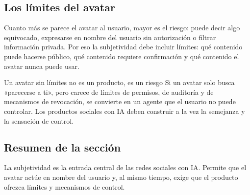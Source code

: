 \subsection{Los límites del avatar}

Cuanto más se parece el avatar al usuario, mayor es el riesgo: puede decir algo equivocado, expresarse en nombre del usuario sin autorización o filtrar información privada. Por eso la subjetividad debe incluir límites: qué contenido puede hacerse público, qué contenido requiere confirmación y qué contenido el avatar nunca puede usar.

\begin{warningbox}{Un avatar sin límites no es un producto, es un riesgo}
Si un avatar solo busca «parecerse a ti», pero carece de límites de permisos, de auditoría y de mecanismos de revocación, se convierte en un agente que el usuario no puede controlar. Los productos sociales con IA deben construir a la vez la semejanza y la sensación de control.
\end{warningbox}

\subsection{Resumen de la sección}

La subjetividad es la entrada central de las redes sociales con IA. Permite que el avatar actúe en nombre del usuario y, al mismo tiempo, exige que el producto ofrezca límites y mecanismos de control.
